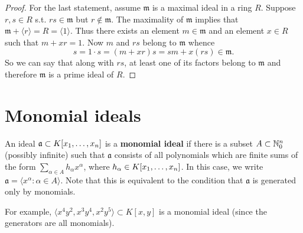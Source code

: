 \documentclass[english,bachelor]{liumaiex}
\begin{document}
\begin{proof}
For the last statement, assume $\mathfrak{m}$ is a maximal ideal in a ring $R$. Suppose $r,s\in R$ s.t. $rs\in\mathfrak{m}$ but $r\notin \mathfrak{m}$. The maximality of $\mathfrak{m}$ implies that $\mathfrak{m}+\langle r \rangle = R = \langle 1 \rangle.$ Thus there exists an element $m\in\mathfrak{m}$ and an element $x\in R$ such that $m+xr=1.$ Now $m$ and $rs$ belong to $\mathfrak{m}$ whence
\begin{displaymath}
s=1\cdot s = (m+xr)s = sm + x(rs) \in \mathfrak{m}.
\end{displaymath}
So we can say that along with $rs$, at least one of its factors belong to $\mathfrak{m}$ and therefore $\mathfrak{m}$ is a prime ideal of $R$.
\end{proof}

\section{Monomial ideals}
\begin{define}
An ideal $\mathfrak{a}\subset K[x_1,\dots, x_n]$ is a \textbf{monomial ideal} if there is a subset $A\subset\mathbb{N}_{0}^n$ (possibly infinite) such that $\mathfrak{a}$ consists of all polynomials which are finite sums of the form $\sum_{\alpha\in A} h_\alpha x^\alpha$, where $h_\alpha \in K[x_1,\dots, x_n]$. In this case, we write $\mathfrak{a}=\langle x^\alpha\colon\alpha\in A\rangle$. Note that this is equivalent to the condition that $\mathfrak{a}$ is generated only by monomials.
\end{define}
For example, $\langle x^4y^2,x^3y^4,x^2y^5\rangle \subset K[x,y]$ is a monomial ideal (since the generators are all monomials).


\end{document}
